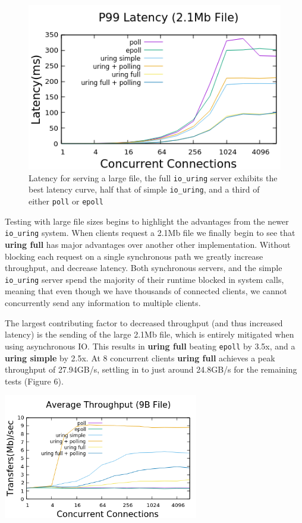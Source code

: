\documentclass[conference]{IEEEtran}{}
\begin{document}
\begin{figure}
\centering
\includegraphics[width=4.5in]{big_latency.png}
\caption{Latency for serving a large file, the full \texttt{io\_uring} server exhibits the best latency curve, half that of simple \texttt{io\_uring}, and a third of either \texttt{poll} or \texttt{epoll}}
\end{figure}

Testing with large file sizes begins to highlight the advantages from the newer \texttt{io\_uring} system. When clients request a 2.1Mb file we finally begin to see that \textbf{uring full} has major advantages over another other implementation. Without blocking each request on a single synchronous path we greatly increase throughput, and decrease latency. Both synchronous servers, and the simple \texttt{io\_uring} server spend the majority of their runtime blocked in system calls, meaning that even though we have thousands of connected clients, we cannot concurrently send any information to multiple clients.

The largest contributing factor to decreased throughput (and thus increased latency) is the sending of the large 2.1Mb file, which is entirely mitigated when using asynchronous IO. This results in \textbf{uring full} beating \texttt{epoll} by 3.5x, and a \textbf{uring simple} by 2.5x. At 8 concurrent clients \textbf{uring full} achieves a peak throughput of 27.94GB/s, settling in to just around 24.8GB/s for the remaining tests (Figure 6).

\begin{center}
\includegraphics[width=3.35in]{small_throughput.png}
\end{center}
\end{document}
